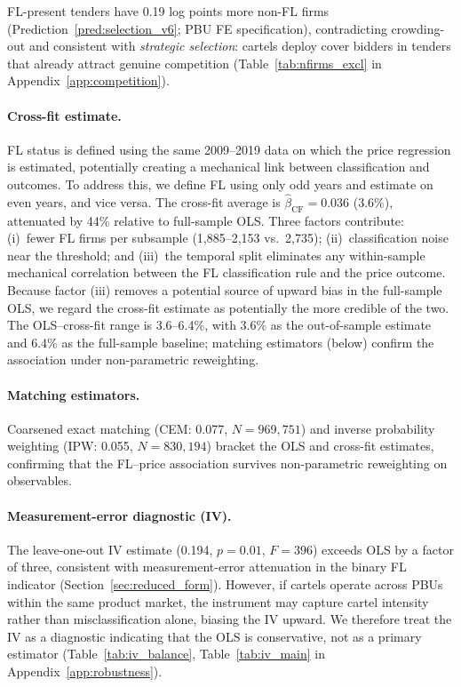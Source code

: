 

FL-present tenders have 0.19 log points more non-FL firms
(Prediction~\ref{pred:selection_v6}; PBU FE specification),
contradicting crowding-out and consistent with \emph{strategic
selection}: cartels deploy cover bidders in tenders that already attract
genuine competition
(Table~\ref{tab:nfirms_excl} in Appendix~\ref{app:competition}).

\paragraph{Cross-fit estimate.}
FL status is defined using the same 2009--2019 data on which the price
regression is estimated, potentially creating a mechanical link between
classification and outcomes. To address this, we define FL using only
odd years and estimate on even years, and vice versa. The cross-fit
average is $\hat{\beta}_{\text{CF}} = 0.036$ (3.6\%), attenuated by
44\% relative to full-sample OLS. Three factors contribute:
(i)~fewer FL firms per subsample (1,885--2,153 vs.\ 2,735);
(ii)~classification noise near the threshold; and (iii)~the temporal
split eliminates any within-sample mechanical correlation between
the FL classification rule and the price outcome. Because factor
(iii) removes a potential source of upward bias in the full-sample
OLS, we regard the cross-fit estimate as potentially the more
credible of the two. The OLS--cross-fit range is 3.6--6.4\%, with
3.6\% as the out-of-sample estimate and 6.4\% as the full-sample
baseline; matching estimators (below) confirm the association
under non-parametric reweighting.

\paragraph{Matching estimators.}
Coarsened exact matching (CEM: 0.077, $N = 969{,}751$) and inverse
probability weighting (IPW: 0.055, $N = 830{,}194$) bracket the OLS
and cross-fit estimates, confirming that the FL--price association
survives non-parametric reweighting on observables.

\paragraph{Measurement-error diagnostic (IV).}
The leave-one-out IV estimate (0.194, $p = 0.01$, $F = 396$) exceeds
OLS by a factor of three, consistent with measurement-error
attenuation in the binary FL indicator
(Section~\ref{sec:reduced_form}). However, if cartels operate across
PBUs within the same product market, the instrument may capture cartel
intensity rather than misclassification alone, biasing the IV upward.
We therefore treat the IV as a diagnostic indicating that the OLS is
conservative, not as a primary estimator
(Table~\ref{tab:iv_balance}, Table~\ref{tab:iv_main} in
Appendix~\ref{app:robustness}).

